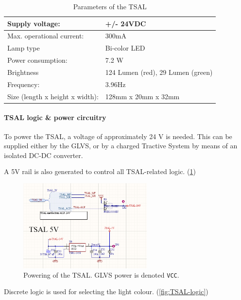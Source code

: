 \begin{table}[H]
	\centering
	\caption{Parameters of the TSAL}
	\begin{tabularx}{\textwidth}{|X|X|}
		\hline
		Supply voltage: & +/- 24VDC \\[\TableSize]
		\hline
		Max. operational current: & 300mA \\[\TableSize]
		\hline
		Lamp type & Bi-color LED \\[\TableSize]
		\hline
		Power consumption: & 7.2 W \\[\TableSize]
		\hline
		Brightness & 124 Lumen (red), 29 Lumen (green) \\[\TableSize]
		\hline
		Frequency: & 3.96Hz \\[\TableSize]
		\hline
		Size (length x height x width): & 128mm x 20mm x 32mm \\[\TableSize]
		\hline
	\end{tabularx}%
	\label{tab:TSAL}%
\end{table}%

\paragraph{TSAL logic \& power circuitry}

To power the TSAL, a voltage of approximately 24 V is needed. This can be supplied either by the GLVS, or by a charged Tractive System by means of an isolated DC-DC converter.

A 5V rail is also generated to control all TSAL-related logic. (\ref{fig:TSAL-ECUB-5V})

\begin{figure}[H]
	\centering
	\includegraphics[width=0.6\textwidth]{./img/TSAL-ECUB-5V.png}
	\caption[Powering of the TSAL]{Powering of the TSAL. GLVS power is denoted \texttt{VCC}.}
	\label{fig:TSAL-ECUB-5V}
\end{figure}

Discrete logic is used for selecting the light colour. (\ref{fig:TSAL-logic})

